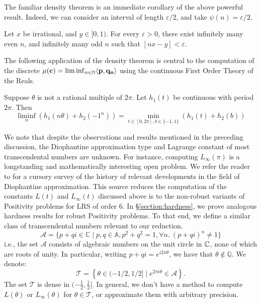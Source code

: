 The familiar density theorem is an immediate corollary of the above powerful result. Indeed, we can consider an interval of length $\varepsilon/2$, and take $\psi(n) = \varepsilon/2$.
\begin{lemma}
\label{lemma:density}
Let $x$ be irrational, and $y \in [0, 1)$. For every $\varepsilon > 0$, there exist infinitely many even $n$, and infinitely many odd $n$ such that $[nx - y] < \varepsilon$.
\end{lemma}

The following application of the density theorem is central to the computation of the discrete $\mu(\mathbf{c}) = \liminf_{n\in \mathbb{N}}\langle\mathbf{p}, \mathbf{q_n}\rangle$ using the continuous First Order Theory of the Reals.
\begin{lemma}
Suppose $\theta$ is not a rational multiple of $2\pi$. Let $h_1(t)$ be continuous with period $2\pi$. Then
\begin{equation}
\label{eq:liminfmin}
\liminf_n \left(h_1(n\theta) + h_2(-1^n)\right) = \min_{t \in [0, 2\pi], b\in \{-1, 1\}} \left(h_1(t) + h_2(b)\right)
\end{equation}
\end{lemma}

We note that despite the observations and results mentioned in the preceding discussion, the Diophantine approximation type and Lagrange constant of most transcendental numbers are unknown. For instance, computing $L_\infty(\pi)$ is a longstanding and mathematically interesting open problem. We refer the reader to \cite[Section 5]{joeljames3} for a cursory survey of the history of relevant developments in the field of Diophantine approximation. This source reduces the computation of the constants $L(t)$ and $L_\infty(t)$ discussed above is to the non-robust variants of Positivity problems for LRS of order 6. In \S\ref{section:hardness}, we prove analogous hardness results for robust Positivity problems. To that end, we define a similar class of transcendental numbers relevant to our reduction.
\begin{equation}
\mathcal A=\{p+q i \in \mathbb{C} \mid p,q \in \mathbb{A}, p^2+q^2=1, \forall n.~(p + qi)^n \ne 1\}
\end{equation}
i.e., the set $\mathcal A$ consists of algebraic numbers on the unit circle in $\mathbb{C}$, none of which are roots of unity. In particular, writing $p+q i= e^{i 2 \pi \theta}$, we have that $\theta \notin \mathbb{Q}$. We denote:
\begin{equation}
\label{eq:keyset}
\mathcal{T} = \left\{ \theta \in (- 1/2, 1/2] \mid e^{2 \pi i \theta} \in \mathcal{A}\right\}.
\end{equation}
The set $\mathcal{T}$ is dense in $(- \frac 1 2, \frac 1 2]$. In general, we don't have a method to compute $L(\theta)$ or $L_\infty(\theta)$ for $\theta \in \mathcal{T}$, or approximate them with arbitrary precision.

